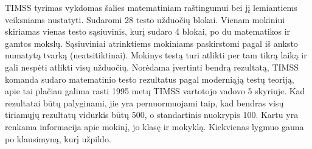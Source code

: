 \documentclass[12pt,a4paper]{article}
\begin{document}
\indent TIMSS tyrimas vykdomas šalies matematiniam raštingumui bei jį lemiantiems veiksniams nustatyti. Sudaromi 28 testo užduočių blokai. Vienam mokiniui skiriamas vienas testo sąsiuvinis, kurį sudaro 4 blokai, po du matematikos ir gamtos mokslų. Sąsiuviniai atrinktiems mokiniams paskirstomi pagal iš anksto numatytą tvarką (neatsitiktinai). Mokinys testą turi atlikti per tam tikrą laiką ir gali nespėti atlikti visų užduočių. Norėdama įvertinti bendrą rezultatą, TIMSS komanda sudaro matematinio testo rezultatus pagal moderniąją testų teoriją, apie tai plačiau galima rasti 1995 metų TIMSS vartotojo vadovo\cite{timss1995} 5 skyriuje. Kad rezultatai būtų palyginami, jie yra pernuormuojami taip, kad bendras visų tiriamųjų rezultatų vidurkis būtų 500, o standartinis nuokrypis 100. Kartu yra renkama informacija apie mokinį, jo klasę ir mokyklą. Kiekvienas lygmuo gauna po klausimyną, kurį užpildo.\cite{timss2011lt}
\end{document}

